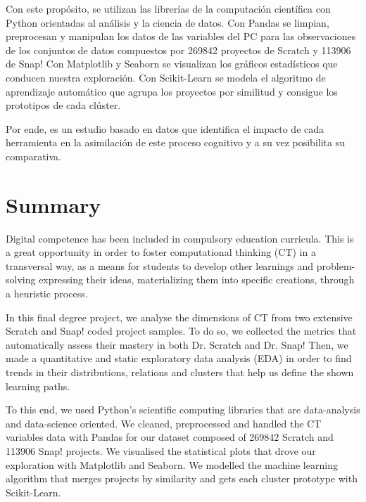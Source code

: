\documentclass[a4paper, 12pt]{book}
\begin{document}
Con este propósito, se utilizan las librerías de la computación científica con Python orientadas al análisis y la ciencia de datos. Con Pandas se limpian, preprocesan y manipulan los datos de las variables del PC para las observaciones de los conjuntos de datos compuestos por 269842 proyectos de Scratch y 113906 de Snap! Con Matplotlib y Seaborn se visualizan los gráficos estadísticos que conducen nuestra exploración. Con Scikit-Learn se modela el algoritmo de aprendizaje automático que agrupa los proyectos por similitud y consigue los prototipos de cada clúster.

Por ende, es un estudio basado en datos que identifica el impacto de cada herramienta en la asimilación de este proceso cognitivo y a su vez posibilita su comparativa.



\chapter*{Summary}

Digital competence has been included in compulsory education curricula. This is a great opportunity in order to foster computational thinking (CT) in a transversal way, as a means for students to develop other learnings and problem-solving expressing their ideas, materializing them into specific creations, through a heuristic process.

In this final degree project, we analyse the dimensions of CT from two extensive Scratch and Snap! coded project samples. To do so, we collected the metrics that automatically assess their mastery in both Dr. Scratch and Dr. Snap! Then, we made a quantitative and static exploratory data analysis (EDA) in order to find trends in their distributions, relations and clusters that help us define the shown learning paths.

To this end, we used Python's scientific computing libraries that are data-analysis and data-science oriented. We cleaned, preprocessed and handled the CT variables data with Pandas for our dataset composed of 269842 Scratch and 113906 Snap! projects. We visualised the statistical plots that drove our exploration with Matplotlib and Seaborn.
We modelled the machine learning algorithm that merges projects by similarity and gets each cluster prototype with Scikit-Learn.
\end{document}
